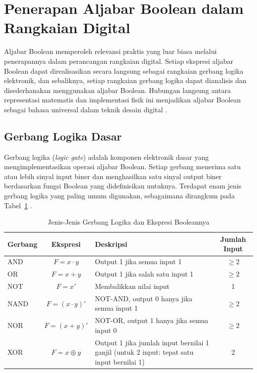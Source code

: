 \section{Penerapan Aljabar Boolean dalam Rangkaian Digital}

Aljabar Boolean memperoleh relevansi praktis yang luar biasa melalui penerapannya dalam perancangan rangkaian digital. Setiap ekspresi aljabar Boolean dapat direalisasikan secara langsung sebagai rangkaian gerbang logika elektronik, dan sebaliknya, setiap rangkaian gerbang logika dapat dianalisis dan disederhanakan menggunakan aljabar Boolean. Hubungan langsung antara representasi matematis dan implementasi fisik ini menjadikan aljabar Boolean sebagai bahasa universal dalam teknik desain digital \cite{grinnell_logic}.

\subsection{Gerbang Logika Dasar}

Gerbang logika (\textit{logic gate}) adalah komponen elektronik dasar yang mengimplementasikan operasi aljabar Boolean. Setiap gerbang menerima satu atau lebih sinyal input biner dan menghasilkan satu sinyal output biner berdasarkan fungsi Boolean yang didefinisikan untuknya. Terdapat enam jenis gerbang logika yang paling umum digunakan, sebagaimana dirangkum pada Tabel~\ref{tab:gerbang-logika} \cite{hackatronic}.

\begin{table}[htbp]
\centering
\small
\renewcommand{\arraystretch}{1.3}
\begin{tabular}{|l|c|>{\raggedright\arraybackslash}p{4.5cm}|c|}
\hline
\textbf{Gerbang} & \textbf{Ekspresi} & \textbf{Deskripsi} & \textbf{Jumlah Input} \\ \hline
AND & $F = x \cdot y$ & Output 1 jika semua input 1 & $\geq 2$ \\ \hline
OR & $F = x + y$ & Output 1 jika salah satu input 1 & $\geq 2$ \\ \hline
NOT & $F = x'$ & Membalikkan nilai input & 1 \\ \hline
NAND & $F = (x \cdot y)'$ & NOT-AND, output 0 hanya jika semua input 1 & $\geq 2$ \\ \hline
NOR & $F = (x + y)'$ & NOT-OR, output 1 hanya jika semua input 0 & $\geq 2$ \\ \hline
XOR & $F = x \oplus y$ & Output 1 jika jumlah input bernilai 1 ganjil (untuk 2 input: tepat satu input bernilai 1) & 2 \\ \hline
\end{tabular}
\caption{Jenis-Jenis Gerbang Logika dan Ekspresi Booleannya}
\label{tab:gerbang-logika}
\end{table}

